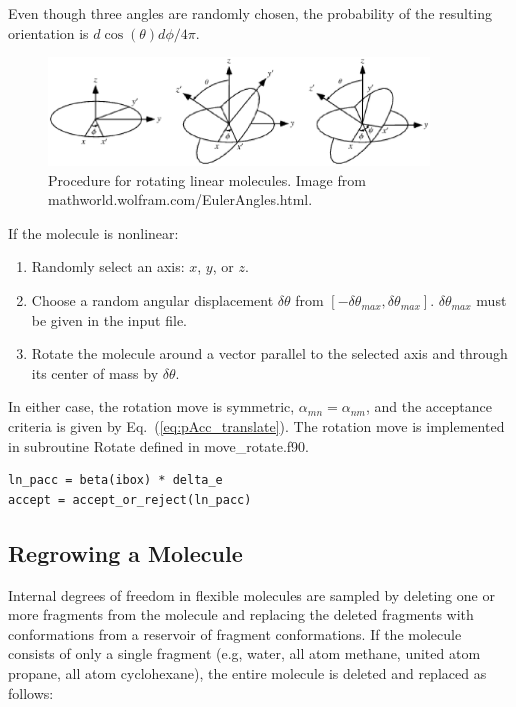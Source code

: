 Even though three angles are randomly chosen, the probability of the resulting orientation is $d\cos(\theta)d\phi/4\pi$.

\begin{figure}[h]
	\centering
	\includegraphics[width=0.9\textwidth]{EulerAngles.eps}
	\caption{Procedure for rotating linear molecules. \newline Image from mathworld.wolfram.com/EulerAngles.html.}
	\label{fig:EulerAngles}
\end{figure}

If the molecule is nonlinear:

\begin{enumerate}
	\item Randomly select an axis: $x$, $y$, or $z$.
	\item Choose a random angular displacement $\delta \theta$ from $[-\delta \theta_{max}, \delta \theta_{max}]$. $\delta \theta_{max}$ must be given in the input file.
	\item Rotate the molecule around a vector parallel to the selected axis and through its center of mass by $\delta \theta$.
\end{enumerate}

In either case, the rotation move is symmetric, $\alpha_{mn} = \alpha_{nm}$, and the acceptance criteria is given by Eq.\ (\ref{eq:pAcc_translate}). The rotation move is implemented in subroutine Rotate defined in move\_rotate.f90.

\begin{lstlisting}[firstnumber=268, caption=move\_rotate.f90, label=code:rotate]
ln_pacc = beta(ibox) * delta_e
accept = accept_or_reject(ln_pacc)
\end{lstlisting}

\subsection{Regrowing a Molecule}
\label{sec:regrow}
Internal degrees of freedom in flexible molecules are sampled by deleting one or more fragments from the molecule and replacing the deleted fragments with conformations from a reservoir of fragment conformations. If the molecule consists of only a single fragment (e.g, water, all atom methane, united atom propane, all atom cyclohexane), the entire molecule is deleted and replaced as follows:

